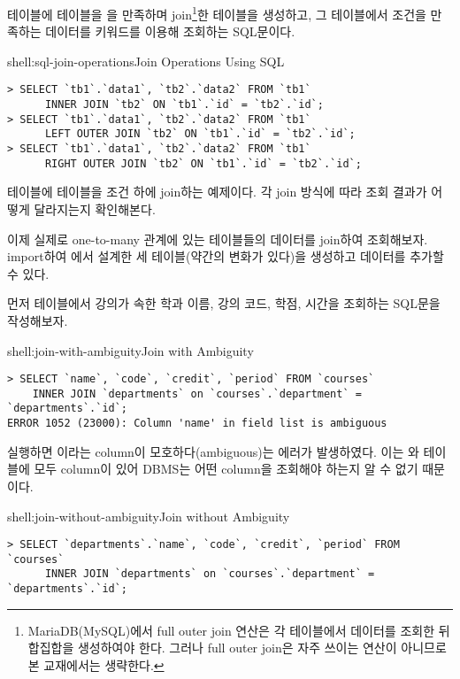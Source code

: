 \은  테이블에  테이블을 을 만족하며 join\footnote{MariaDB(MySQL)에서 full outer join 연산은 각 테이블에서 데이터를 조회한 뒤 합집합을 생성하여야 한다. 그러나 full outer join은 자주 쓰이는 연산이 아니므로 본 교재에서는 생략한다.}한 테이블을 생성하고, 그 테이블에서  조건을 만족하는 데이터를  키워드를 이용해 조회하는 SQL문이다.

\begin{shellenv}{shell:sql-join-operations}{Join Operations Using SQL}\begin{verbatim}
> SELECT `tb1`.`data1`, `tb2`.`data2` FROM `tb1`
      INNER JOIN `tb2` ON `tb1`.`id` = `tb2`.`id`;
> SELECT `tb1`.`data1`, `tb2`.`data2` FROM `tb1`
      LEFT OUTER JOIN `tb2` ON `tb1`.`id` = `tb2`.`id`;
> SELECT `tb1`.`data1`, `tb2`.`data2` FROM `tb1`
      RIGHT OUTER JOIN `tb2` ON `tb1`.`id` = `tb2`.`id`;
\end{verbatim}
\end{shellenv}

\는  테이블에  테이블을  조건 하에 join하는 예제이다. 각 join 방식에 따라 조회 결과가 어떻게 달라지는지 확인해본다.

이제 실제로 one-to-many 관계에 있는 테이블들의 데이터를 join하여 조회해보자. \을 import하여 에서 설계한 세 테이블(약간의 변화가 있다)을 생성하고 데이터를 추가할 수 있다.

먼저  테이블에서 강의가 속한 학과 이름, 강의 코드, 학점, 시간을 조회하는 SQL문을 작성해보자.

\begin{shellenv}{shell:join-with-ambiguity}{Join with Ambiguity}\begin{verbatim}
> SELECT `name`, `code`, `credit`, `period` FROM `courses`
    INNER JOIN `departments` on `courses`.`department` = `departments`.`id`;
ERROR 1052 (23000): Column 'name' in field list is ambiguous
\end{verbatim}
\end{shellenv}

\를 실행하면 이라는 column이 모호하다(ambiguous)는 에러가 발생하였다. 이는 와  테이블에 모두  column이 있어 DBMS는 어떤  column을 조회해야 하는지 알 수 없기 때문이다.

\begin{shellenv}{shell:join-without-ambiguity}{Join without Ambiguity}\begin{verbatim}
> SELECT `departments`.`name`, `code`, `credit`, `period` FROM `courses`
      INNER JOIN `departments` on `courses`.`department` = `departments`.`id`;
\end{verbatim}
\end{shellenv}

